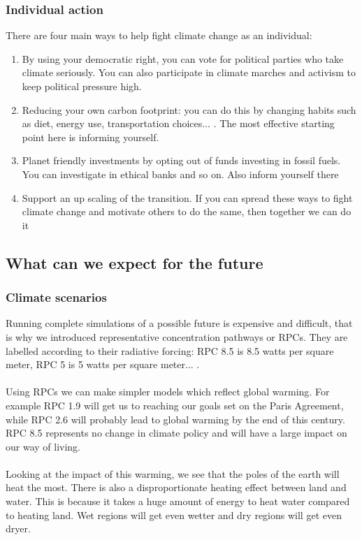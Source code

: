\documentclass[../summary.tex]{subfiles}
\begin{document}
			\subsubsection{Individual action} 
				There are four main ways to help fight climate change as an individual:
				\begin{enumerate}
					\item By using your democratic right, you can vote for political parties who take climate seriously. You can also participate in climate marches and activism to keep political pressure high. 
					\item Reducing your own carbon footprint: you can do this by changing habits such as diet, energy use, transportation choices... . The most effective starting point here is informing yourself. 
					\item Planet friendly investments by opting out of funds investing in fossil fuels. You can investigate in ethical banks and so on. Also inform yourself there
					\item Support an up scaling of the transition. If you can spread these ways to fight climate change and motivate others to do the same, then together we can do it
				\end{enumerate}
				
		\subsection{What can we expect for the future}
			\subsubsection{Climate scenarios}
				Running complete simulations of a possible future is expensive and difficult, that is why we introduced  representative concentration pathways or RPCs. They are labelled according to their radiative forcing: RPC 8.5 is 8.5 watts per square meter, RPC 5 is 5 watts per square meter... . \\
				\\
				Using RPCs we can make simpler models which reflect global warming. For example RPC 1.9 will get us to reaching our goals set on the Paris Agreement, while RPC 2.6 will probably lead to global warming by the end of this century. RPC 8.5 represents no change in climate policy and will have a large impact on our way of living. \\
				\\
				Looking at the impact of this warming, we see that the poles of the earth will heat the most. There is also a disproportionate heating effect between land and water. This is because it takes a huge amount of energy to heat water compared to heating land. Wet regions will get even wetter and dry regions will get even dryer. 
	
\end{document}
